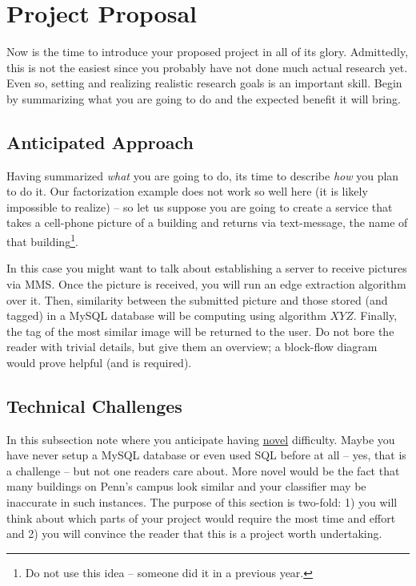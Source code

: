 \documentclass{sig-alternate}
\begin{document}
\section{Project Proposal}
\label{sec:project_proposal}
Now is the time to introduce your proposed project in all of its
glory. Admittedly, this is not the easiest since you probably have not
done much actual research yet. Even so, setting and realizing
realistic research goals is an important skill. Begin by summarizing
what you are going to do and the expected benefit it will bring.

\subsection{Anticipated Approach}
\label{subsec:approach}
Having summarized \textit{what} you are going to do, its time to
describe \textit{how} you plan to do it. Our factorization example
does not work so well here (it is likely impossible to realize) -- so
let us suppose you are going to create a service that takes a
cell-phone picture of a building and returns via text-message, the
name of that building\footnote{Do not use this idea -- someone did it
  in a previous year.}.

In this case you might want to talk about establishing a server to
receive pictures via MMS. Once the picture is received, you will run
an edge extraction algorithm over it. Then, similarity between the
submitted picture and those stored (and tagged) in a MySQL database
will be computing using algorithm $XYZ$. Finally, the tag of the most
similar image will be returned to the user. Do not bore the reader
with trivial details, but give them an overview; a block-flow diagram
would prove helpful (and is required).

\subsection{Technical Challenges}
\label{subsec:tech_challenges}
In this subsection note where you anticipate having \underline{novel}
difficulty. Maybe you have never setup a MySQL database or even used
SQL before at all -- yes, that is a challenge -- but not one readers
care about. More novel would be the fact that many buildings on Penn's
campus look similar and your classifier may be inaccurate in such
instances. The purpose of this section is two-fold: 1) you will think
about which parts of your project would require the most time and
effort and 2) you will convince the reader that this is a project
worth undertaking.
\end{document}
